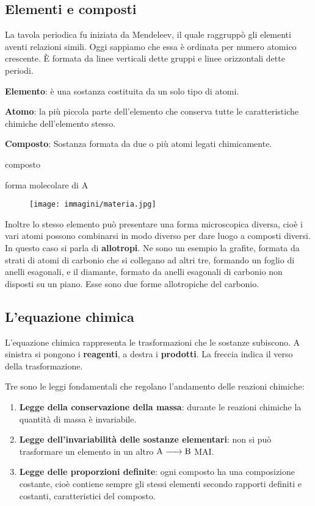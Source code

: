 \subsection{Elementi e composti}
La tavola periodica fu iniziata da Mendeleev, il quale raggruppò gli elementi aventi relazioni simili. Oggi sappiamo che essa è ordinata per numero atomico crescente. È formata da linee verticali dette gruppi e linee orizzontali dette periodi.

\textbf{Elemento}: è una sostanza costituita da un solo tipo di atomi.

\textbf{Atomo}: la più piccola parte dell'elemento che conserva tutte le
caratteristiche chimiche dell'elemento stesso.

\textbf{Composto}: Sostanza formata da due o più atomi legati
chimicamente.

\vspace{0.2cm} composto

\vspace{0.2cm} forma molecolare di A

\begin{figure}[H]
    \hspace{-0.2cm}\texttt{[image: immagini/materia.jpg]}
\end{figure}

Inoltre lo stesso elemento può presentare una forma microscopica diversa, cioè i vari atomi possono combinarsi in modo diverso per dare luogo a composti diversi. In questo caso si parla di \textbf{allotropi}. Ne sono un esempio la grafite, formata da strati di atomi di carbonio che si collegano ad altri tre, formando un foglio di anelli esagonali, e il diamante, formato da anelli esagonali di carbonio non disposti su un piano. Esse sono due forme allotropiche del carbonio.
\subsection{L'equazione chimica}

L'equazione chimica rappresenta le trasformazioni che le sostanze subiscono. A sinistra si pongono i \textbf{reagenti}, a destra i \textbf{prodotti}. La freccia indica il verso della trasformazione. 

Tre sono le leggi fondamentali che regolano l'andamento delle reazioni chimiche:

\begin{enumerate}
    \item \textbf{Legge della conservazione della massa}: durante le reazioni chimiche la quantità di massa è invariabile.
    \item \textbf{Legge dell'invariabilità delle sostanze elementari}: non si può trasformare un elemento in un altro \(\ce{ A -> B }\) MAI.
    \item \textbf{Legge delle proporzioni definite}: ogni composto ha una composizione costante, cioè contiene sempre gli stessi elementi secondo rapporti definiti e costanti, caratteristici del composto.
\end{enumerate}

